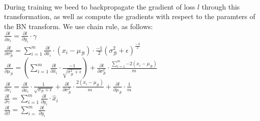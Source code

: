 \documentclass[12pt,a4paper]{article}
\begin{document}
\paragraph{}During training we beed to backpropagate the gradient of loss $l$ through this transformation, as well as compute the gradients with respect to the paramters of the BN transform. We use chain rule, as follows:\\
$\frac{\partial{l}}{\partial{\hat{x}_{i}}} = \frac{\partial{l}}{\partial{y_i}} \cdot \gamma$\\
$\frac{\partial{l}}{\partial{\sigma_{\mathcal{B}}^{2}}} = \sum_{i=1}^{m}\frac{\partial{l}}{\partial{\hat{x}_i}} \cdot (x_i - \mu_{\mathcal{B}}) \cdot \frac{-1}{2}(\sigma_{\mathcal{B}}^{2} + \epsilon)^{\frac{-3}{2}}$\\
$\frac{\partial{l}}{\partial{\mu_{\mathcal{B}}}} = \left(\sum_{i=1}^{m}\frac{\partial{l}}{\partial{\hat{x}_i}} \cdot \frac{-1}{\sqrt{\sigma_{\mathcal{B}}^{2} + \epsilon}}\right) + \frac{\partial{l}}{\partial{\sigma_{\mathcal{B}}^{2}}} \cdot \frac{\sum_{i=1}^{m}{-2(x_i - \mu_{\mathcal{B}})}}{m}$\\
$\frac{\partial{l}}{\partial{x_i}} = \frac{\partial{l}}{\partial{\hat{x}_i}} \cdot \frac{1}{\sqrt{\sigma_{\mathcal{B}} + \epsilon}} + \frac{\partial{l}}{\partial{\sigma_{\mathcal{B}}^{2}}} \cdot \frac{2(x_i - \mu_{\mathcal{B}})}{m} + \frac{\partial{l}}{\partial{\mu_{\mathcal{B}}}} \cdot \frac{1}{m}$\\
$\frac{\partial{l}}{\partial\gamma} = \sum_{i=1}^{m}\frac{\partial{l}}{\partial{y_i}} \cdot \hat{x}_i$ \\
$\frac{\partial{l}}{\partial{\beta}} = \sum_{i=}^{m}\frac{\partial{l}}{\partial{y_i}}$
\end{document}
